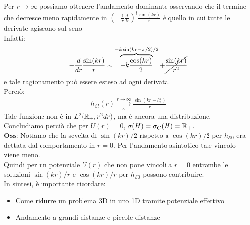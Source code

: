 \documentclass[../../FisicaTeorica.tex]{subfiles}
\begin{document}
Per $r\to \infty$ possiamo ottenere l'andamento dominante osservando che il termine che decresce meno rapidamente in $\left(-\frac{1}{r}\frac{d}{dr}\right)^l \frac{\sin(kr)}{r}$ è quello in cui tutte le derivate agiscono sul seno.\\
Infatti:
\begin{align*}
-\frac{d}{dr} \frac{\sin(kr)}{r} \sim \overbrace{-k\frac{\cos(kr)}{2}}^{-k\sin(kr-\pi/2)/2} + \cancel{\frac{\sin(kr)}{r^2}}
\end{align*} 
e tale ragionamento può essere esteso ad ogni derivata.\\
Perciò:
\begin{align*}
h_{\mathcal{E}l}(r) \xrightarrow[\sim]{r\to \infty} \frac{\sin(kr - l\frac{\pi}{2})}{r}
\end{align*}
Tale funzione non è in $L^2(\mathbb{R}_+, r^2 dr)$, ma è ancora una distribuzione.\\
Concludiamo perciò che per $U(r)=0$, $\sigma(H)= \sigma_C(H) =\mathbb{R}_+$.\\
\textbf{Oss}: Notiamo che la scvelta di $\sin(kr)/2$ rispetto a $\cos(kr)/2$ per $h_{\mathcal{E}0}$ era dettata dal comportamento in $r=0$. Per l'andamento asintotico tale vincolo viene meno.\\
Quindi per un potenziale $U(r)$ che non pone vincoli a $r=0$ entrambe le soluzioni $\sin(kr)/r$ e $\cos(kr)/r$ per $h_{\mathcal{E}0}$ possono contribuire.\\

In sintesi, è importante ricordare:
\begin{itemize}
\item Come ridurre un problema 3D in uno 1D tramite potenziale effettivo
\item Andamento a grandi distanze e piccole distanze
\end{itemize}
\end{document}
